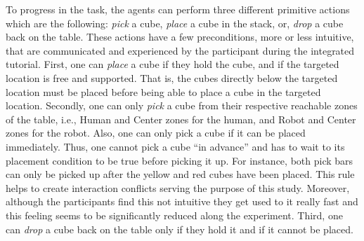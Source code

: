 To progress in the task, the agents can perform three different primitive actions which are the following: \textit{pick} a cube, \textit{place} a cube in the stack, or, \textit{drop} a cube back on the table.
These actions have a few preconditions, more or less intuitive, that are communicated and experienced by the participant during the integrated tutorial.
First, one can \textit{place} a cube if they hold the cube, and if the targeted location is free and supported. That is, the cubes directly below the targeted location must be placed before being able to place a cube in the targeted location.
Secondly, one can only \textit{pick} a cube from their respective reachable zones of the table, i.e., Human and Center zones for the human, and Robot and Center zones for the robot. Also, one can only pick a cube if it can be placed immediately. Thus, one cannot pick a cube ``in advance'' and has to wait to its placement condition to be true before picking it up. For instance, both pick bars can only be picked up after the yellow and red cubes have been placed. This rule helps to create interaction conflicts serving the purpose of this study. Moreover, although the participants find this not intuitive they get used to it really fast and this feeling seems to be significantly reduced along the experiment.
Third, one can \textit{drop} a cube back on the table only if they hold it and if it cannot be placed.

